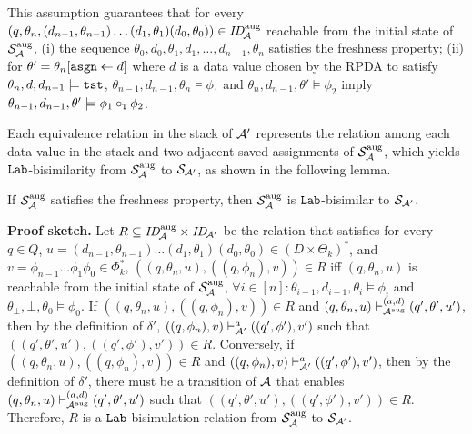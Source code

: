 This assumption guarantees that
for every
$(q,\theta_n,(d_{n-1},\theta_{n-1})\ldots(d_1,\theta_1)(d_0,\theta_0))
\in\mathit{ID}_{\!{\cal A}}^{\mathrm{aug}}$ reachable from the initial state of
${\cal S}_{{\cal A}}^{\mathrm{aug}}$,
(i) the sequence
$\theta_0,d_0,\theta_1,d_1,\ldots,d_{n-1},\theta_n$ satisfies
the freshness property;
(ii) for $\theta'=\theta_n[\mathtt{asgn}\gets d]$ where
$d$ is a data value chosen by the RPDA to satisfy
$\theta_n,d,d_{n-1}\models\mathtt{tst}$,
$\theta_{n-1},d_{n-1},\theta_n\models\phi_1$ and
$\theta_n,d_{n-1},\theta'\models\phi_2$ imply
$\theta_{n-1},d_{n-1},\theta'\models\phi_1\circ_{\mathtt{T}}\phi_2$.

%
Each equivalence relation in the stack of ${\cal A}'$ represents
the relation among each data value in the stack and
two adjacent saved assignments
of ${\cal S}_{{\cal A}}^{\mathrm{aug}}$,
which yields $\mathtt{Lab}$-bisimilarity from
${\cal S}_{{\cal A}}^{\mathrm{aug}}$ to ${\cal S}_{{\cal A}'}$,
as shown in the following lemma.
%
\begin{lemma}\label{lemma:bisim-rpda-pda}
If ${\cal S}_{{\cal A}}^{\mathrm{aug}}$ satisfies the freshness property, then
${\cal S}_{{\cal A}}^{\mathrm{aug}}$ is $\mathtt{Lab}$-bisimilar to
${\cal S}_{{\cal A}'}$.
\end{lemma}
%
{\bf Proof sketch.}\quad
Let $R\subseteq \mathit{ID}_{\!{\cal A}}^{\mathrm{aug}}\times\mathit{ID}_{\!{\cal A}'}$
be the relation
that satisfies
for every $q\in Q$, %
$u=(d_{n-1},\theta_{n-1})\ldots(d_1,\theta_1)(d_0,\theta_0)
 \in(D\times\Theta_k)^*$, and
$v=\phi_{n-1}\ldots\phi_1\phi_0\in\Phi_k^*$,
$((q,\theta_n,u),((q,\phi_n),v))\in R$
iff
$(q,\theta_n,u)$ is reachable from the initial state of
${\cal S}_{{\cal A}}^{\mathrm{aug}}$,
$\forall i\in[n]: \theta_{i-1},d_{i-1},\theta_i\models\phi_i$ and
$\theta_{\bot},{\bot},\theta_0\models\phi_0$.
%
If
$((q,\theta_n,u), ((q,\phi_n),v))\in R$ and
$(q,\theta_n,u)\vdash_{{\cal A}^{\mathrm{aug}}}^{(a,d)}(q',\theta',u')$,
then by the definition of $\delta'$,
$((q,\phi_n),v)\vdash_{{\cal A}'}^a ((q',\phi'),v')$
such that $((q',\theta',u'), ((q',\phi'),v'))\in R$.
Conversely, if
$((q,\theta_n,u),\allowbreak ((q,\phi_n),v))\in R$ and
$((q,\phi_n),v)\vdash_{{\cal A}'}^a ((q',\phi'),v')$,
then by the definition of $\delta'$,
there must be a transition of ${\cal A}$ that enables
$(q,\theta_n,u)\vdash_{{\cal A}^{\mathrm{aug}}}^{(a,d)} (q',\theta',u')$
such that $((q',\theta',u'), ((q',\phi'),v'))\in R$.
%
Therefore, $R$ is a $\mathtt{Lab}$-bisimulation relation from
${\cal S}_{{\cal A}}^{\mathrm{aug}}$ to ${\cal S}_{{\cal A}'}$.


